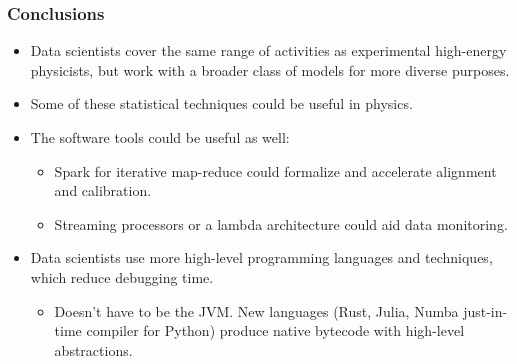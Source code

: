 \documentclass[compress]{beamer}
\begin{document}
\begin{frame}
\frametitle{Conclusions}

\begin{itemize}
\item Data scientists cover the same range of activities as experimental high-energy physicists, but work with a broader class of models for more diverse purposes.

\item Some of these statistical techniques could be useful in physics.

\item The software tools could be useful as well:
\begin{itemize}
\item Spark for iterative map-reduce could formalize and accelerate alignment and calibration.
\item Streaming processors or a lambda architecture could aid data monitoring.
\end{itemize}

\item Data scientists use more high-level programming languages and techniques, which reduce debugging time.
\begin{itemize}
\item Doesn't have to be the JVM. New languages (Rust, Julia, Numba just-in-time compiler for Python) produce native bytecode with high-level abstractions.
\end{itemize}
\end{itemize}

\label{numpages}
\end{frame}
\end{document}
